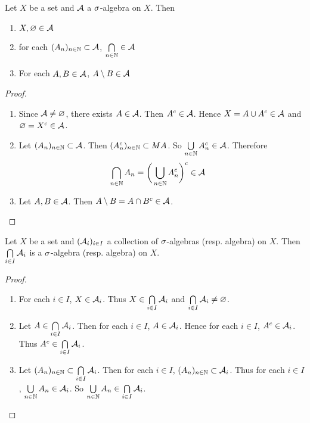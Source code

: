 \documentclass{book}
\begin{document}
	\begin{ex}  
		Let $X$ be a set and $\mathcal{A}$ a $\sigma$-algebra on $X$. Then 
		\begin{enumerate}
			\item $X, \varnothing \in \mathcal{A}$
			\item for each $(A_n)_{n \in \mathbb{N}} \subset \mathcal{A}$, $\bigcap\limits_{n \in \mathbb{N}} \in \mathcal{A}$
			\item For each $A, B \in \mathcal{A}$, $A \setminus B \in \mathcal{A}$  
		\end{enumerate}
	\end{ex}
	
	\begin{proof}\
		\begin{enumerate}
			\item Since $\mathcal{A} \neq \varnothing$, there exists $A \in \mathcal{A}$. Then $A^c \in \mathcal{A}$. Hence $X = A \cup A^c \in \mathcal{A}$ and $\varnothing = X^c \in \mathcal{A}$.
			\item Let $(A_n)_{n \in \mathbb{N}} \subset \mathcal{A}$. Then $(A_n^c)_{n \in \mathbb{N}} \subset MA$. So $\bigcup\limits_{n \in \mathbb{N}}A_n^c \in \mathcal{A}$. Therefore \begin{align*}
				\bigcap\limits_{n \in \mathbb{N}}A_n 
				&= \bigg(\bigcup\limits_{n \in \mathbb{N}}A_n^c\bigg)^c \in \mathcal{A}
			\end{align*}
			\item Let $A,B \in \mathcal{A}$. Then $A \setminus B = A \cap B^c \in \mathcal{A}$. 
		\end{enumerate}
	\end{proof}
	
	\begin{ex}  
		Let $X$ be a set and $(\mathcal{A}_i)_{i \in I}$ a collection of $\sigma$-algebras (resp. algebra) on $X$. Then $\bigcap\limits_{i \in I}\mathcal{A}_i$ is a $\sigma$-algebra (resp. algebra) on $X$.
	\end{ex}
	
	\begin{proof}\
		\begin{enumerate}
			\item For each $i \in I$, $X \in \mathcal{A}_i$. Thus $X \in \bigcap\limits_{i \in I}\mathcal{A}_i$ and $\bigcap\limits_{i \in I}\mathcal{A}_i \neq \varnothing$.
			\item Let $A \in \bigcap\limits_{i \in I}\mathcal{A}_i$. Then for each $i \in I$, $A \in \mathcal{A}_i$. Hence for each $i \in I$, $A^c \in \mathcal{A}_i$. Thus $A^c \in \bigcap\limits_{i \in I}\mathcal{A}_i$. 
			\item Let $(A_n)_{n \in \mathbb{N}} \subset \bigcap\limits_{i \in I}\mathcal{A}_i$. Then for each $i \in I$, $(A_n)_{n \in \mathbb{N}} \subset \mathcal{A}_i$. Thus for each $i \in I$, $\bigcup\limits_{n \in \mathbb{N}}A_n \in \mathcal{A}_i$. So $\bigcup\limits_{n \in \mathbb{N}}A_n \in \bigcap\limits_{i \in I}\mathcal{A}_i$.
		\end{enumerate}
	\end{proof}
	
\end{document}
